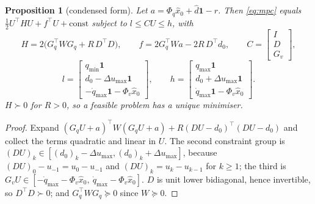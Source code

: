 \documentclass[11pt,a4paper]{article}
\newtheorem{proposition}[theorem]{Proposition}
\theoremstyle{remark}
\theoremstyle{definition}
\begin{document}
\begin{proposition}[condensed form]\label{prop:qp}
Let $a=\Phi_q\hat x_0+\hat d\mathbf 1-r$. Then \eqref{eq:mpc} equals $\tfrac12U^\top HU+f^\top U+\mathrm{const}$ subject to $l\le CU\le h$, with
\begin{equation}\label{eq:H}
H=2\big(G_q^\top WG_q+R\,D^\top D\big),\qquad f=2G_q^\top Wa-2R\,D^\top d_0,\qquad C=\begin{bmatrix}I\\D\\G_v\end{bmatrix},
\end{equation}
\[
l=\begin{bmatrix}q_{\min}\mathbf1\\ d_0-\Delta u_{\max}\mathbf1\\ -\dot q_{\max}\mathbf1-\Phi_v\hat x_0\end{bmatrix},\qquad
h=\begin{bmatrix}q_{\max}\mathbf1\\ d_0+\Delta u_{\max}\mathbf1\\ \dot q_{\max}\mathbf1-\Phi_v\hat x_0\end{bmatrix}.
\]
$H\succ0$ for $R>0$, so a feasible problem has a unique minimiser.
\end{proposition}
\begin{proof}
Expand $(G_qU+a)^\top W(G_qU+a)+R(DU-d_0)^\top(DU-d_0)$ and collect the terms quadratic and linear in $U$. The second constraint group is $(DU)_k\in[(d_0)_k-\Delta u_{\max},(d_0)_k+\Delta u_{\max}]$, because
$(DU)_0-u_{-1}=u_0-u_{-1}$ and $(DU)_k=u_k-u_{k-1}$ for $k\ge1$; the third is $G_vU\in[-\dot q_{\max}-\Phi_v\hat x_0,\ \dot q_{\max}-\Phi_v\hat x_0]$.
$D$ is unit lower bidiagonal, hence invertible, so $D^\top D\succ0$; and $G_q^\top WG_q\succeq0$ since $W\succeq0$.
\end{proof}
\end{document}
